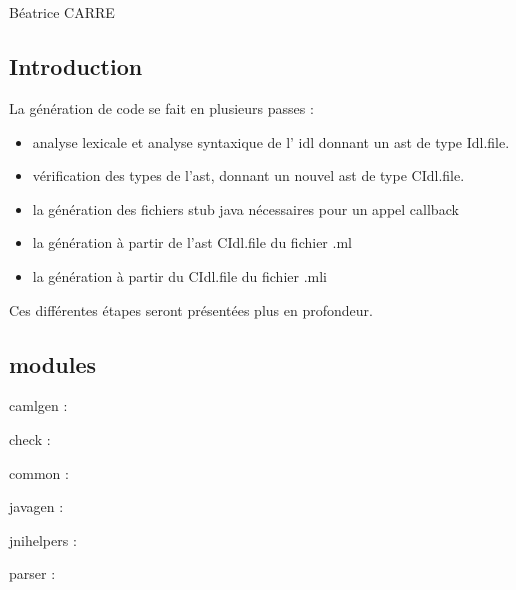 \documentclass[a4paper, 11pt]{report}
\begin{document}
\chapter{}

Béatrice CARRE

\section*{Introduction}

La génération de code se fait en plusieurs passes :
\begin{itemize}
\item analyse lexicale et analyse syntaxique de l' idl donnant un
  ast de type Idl.file.
\item vérification des types de l'ast, donnant un nouvel ast de type
  CIdl.file.
\item la génération des fichiers stub java nécessaires pour un appel callback 
\item la génération à partir de l'ast CIdl.file du fichier .ml
\item la génération à partir du CIdl.file du fichier .mli
\end{itemize}
Ces différentes étapes seront présentées plus en profondeur.

\section{modules}

camlgen :

check :

common :

javagen :

jnihelpers :

parser :
\end{document}
